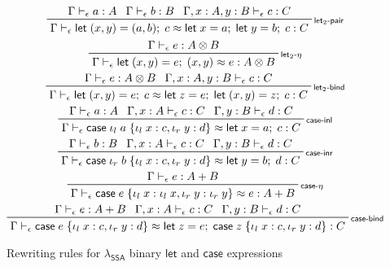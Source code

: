 \documentclass[acmsmall,screen,review]{acmart}
\newcommand{\ms}[1]{\ensuremath{\mathsf{#1}}}
\newcommand{\lto}{:}
\newcommand{\linl}[1]{\iota_l\;{#1}}
\newcommand{\linr}[1]{\iota_r\;{#1}}
\newcommand{\letexpr}[3]{\ensuremath{\ms{let}\;#1 = #2;\;#3}}
\newcommand{\caseexpr}[5]{\ms{case}\;#1\;\{\linl{#2} \lto #3, \linr{#4} \lto #5\}}
\newcommand{\bhyp}[2]{#1 : #2}
\newcommand{\rle}[1]{{\scriptsize\textsf{#1}}}
\newcommand{\hasty}[4]{#1 \vdash_{#2} #3: {#4}}
\newcommand{\teqv}{\approx}
\newcommand{\tmeq}[5]{#1 \vdash_{#2} #3 \teqv #4 : {#5}}
\newcommand{\isotopessa}{\(\lambda_{\ms{SSA}}\)}
\begin{document}
\begin{figure}
  \begin{gather*}
    \prftree[r]{\rle{let$_2$-pair}}
      {\hasty{\Gamma}{\epsilon}{a}{A}}
      {\hasty{\Gamma}{\epsilon}{b}{B}}
      {\hasty{\Gamma, \bhyp{x}{A}, \bhyp{y}{B}}{\epsilon}{c}{C}}
      {\tmeq{\Gamma}{\epsilon}{\letexpr{(x, y)}{(a, b)}{c}}{\letexpr{x}{a}{\letexpr{y}{b}{c}}}{C}}
    \\
    \prftree[r]{\rle{let$_2$-$\eta$}}
      {\hasty{\Gamma}{\epsilon}{e}{A \otimes B}}
      {\tmeq{\Gamma}{\epsilon}{\letexpr{(x, y)}{e}{(x, y)}}{e}{A \otimes B}} 
    \\
    \prftree[r]{\rle{let$_2$-bind}}
      {\hasty{\Gamma}{\epsilon}{e}{A \otimes B}}
      {\hasty{\Gamma, \bhyp{x}{A}, \bhyp{y}{B}}{\epsilon}{c}{C}}
      {\tmeq{\Gamma}{\epsilon}
        {\letexpr{(x, y)}{e}{c}}
        {\letexpr{z}{e}{\letexpr{(x, y)}{z}{c}}}{C}}
    \\
    \prftree[r]{\rle{case-inl}}
      {\hasty{\Gamma}{\epsilon}{a}{A}}
      {\hasty{\Gamma, \bhyp{x}{A}}{\epsilon}{c}{C}}
      {\hasty{\Gamma, \bhyp{y}{B}}{\epsilon}{d}{C}}
      {\tmeq{\Gamma}{\epsilon}{\caseexpr{\linl{a}}{x}{c}{y}{d}}{\letexpr{x}{a}{c}}{C}}
    \\
    \prftree[r]{\rle{case-inr}}
      {\hasty{\Gamma}{\epsilon}{b}{B}}
      {\hasty{\Gamma, \bhyp{x}{A}}{\epsilon}{c}{C}}
      {\hasty{\Gamma, \bhyp{y}{B}}{\epsilon}{d}{C}}
      {\tmeq{\Gamma}{\epsilon}{\caseexpr{\linr{b}}{x}{c}{y}{d}}{\letexpr{y}{b}{d}}{C}}
    \\
    \prftree[r]{\rle{case-$\eta$}}
      {\hasty{\Gamma}{\epsilon}{e}{A + B}}
      {\tmeq{\Gamma}{\epsilon}{\caseexpr{e}{x}{\linl{x}}{y}{\linr{y}}}{e}{A + B}}
    \\
    \prftree[r]{\rle{case-bind}}
      {\hasty{\Gamma}{\epsilon}{e}{A + B}}
      {\hasty{\Gamma, \bhyp{x}{A}}{\epsilon}{c}{C}}
      {\hasty{\Gamma, \bhyp{y}{B}}{\epsilon}{d}{C}}
      {\tmeq{\Gamma}{\epsilon}{\caseexpr{e}{x}{c}{y}{d}}
      {\letexpr{z}{e}{\caseexpr{z}{x}{c}{y}{d}}}{C}}
  \end{gather*}
  \Description{}
  \caption{Rewriting rules for \isotopessa{} binary \ms{let} and \ms{case} expressions}
  \label{fig:ssa-let2-case-expr}
\end{figure}
\end{document}
